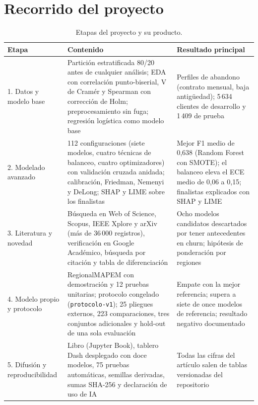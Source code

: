 \documentclass[11pt,a4paper]{article}
\begin{document}

\section{Recorrido del proyecto}\label{app:recorrido}
\begin{table}[H]
\centering
\small
\caption{Etapas del proyecto y su producto.}
\label{tab:recorrido}
\begin{tabular}{p{2.6cm}p{6.4cm}p{5.2cm}}
\toprule
Etapa & Contenido & Resultado principal \\
\midrule
1. Datos y modelo base & Partición estratificada 80/20 antes de cualquier análisis; EDA con correlación punto-biserial, V de Cramér y Spearman con corrección de Holm; preprocesamiento sin fuga; regresión logística como modelo base & Perfiles de abandono (contrato mensual, baja antigüedad); 5\,634 clientes de desarrollo y 1\,409 de prueba \\
2. Modelado avanzado & 112 configuraciones (siete modelos, cuatro técnicas de balanceo, cuatro optimizadores) con validación cruzada anidada; calibración, Friedman, Nemenyi y DeLong; SHAP y LIME sobre los finalistas & Mejor F1 medio de 0,638 (Random Forest con SMOTE); el balanceo eleva el ECE medio de 0,06 a 0,15; finalistas explicados con SHAP y LIME \\
3. Literatura y novedad & Búsqueda en Web of Science, Scopus, IEEE Xplore y arXiv (más de 36\,000 registros), verificación en Google Académico, búsqueda por citación y tabla de diferenciación & Ocho modelos candidatos descartados por tener antecedentes en churn; hipótesis de ponderación por regiones \\
4. Modelo propio y protocolo & RegionalMAPEM con demostración y 12 pruebas unitarias; protocolo congelado (\texttt{protocolo-v1}); 25 pliegues externos, 223 comparaciones, tres conjuntos adicionales y hold-out de una sola evaluación & Empate con la mejor referencia; supera a siete de once modelos de referencia; resultado negativo documentado \\
5. Difusión y reproducibilidad & Libro (Jupyter Book), tablero Dash desplegado con doce modelos, 75 pruebas automáticas, semillas derivadas, sumas SHA-256 y declaración de uso de IA & Todas las cifras del artículo salen de tablas versionadas del repositorio \\
\bottomrule
\end{tabular}
\end{table}
\end{document}
